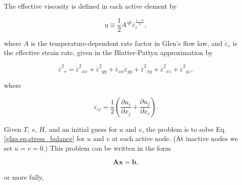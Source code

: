 The effective viscosity is defined in each active element by

\begin{equation}
  \label{gliss.eq.effective_viscosity}
  \eta \equiv \frac{1}{2} A^{\frac{-1}{n}} \dot{\varepsilon }_{e}^{\frac{1-n}{n}},
\end{equation}

\noindent
where $A$ is the temperature-dependent rate factor in Glen's flow law, and $\dot{\varepsilon }_{e}$ is the effective strain rate,
given in the Blatter-Pattyn approximation by 

\begin{equation}
  \label{gliss.eq.effective_strain_rate}
        {{\dot{\varepsilon }}^{2}}_{e}={{\dot{\varepsilon }}^{2}}_{xx}+{{\dot{\varepsilon }}^{2}}_{yy}+{{\dot{\varepsilon }}_{xx}}{{\dot{\varepsilon }}_{yy}}+{{\dot{\varepsilon }}^{2}}_{xy}+{{\dot{\varepsilon }}^{2}}_{xz}+{{\dot{\varepsilon }}^{2}}_{yz},
\end{equation}

\noindent
where

\begin{equation}
  \dot{\varepsilon }_{ij} = \frac{1}{2}\left( \frac{\partial u_{i}}{\partial x_{j}} + \frac{\partial u_{j}}{\partial x_{i}} \right).
\end{equation}

\noindent

Given $T$, $s$, $H$, and an initial guess for $u$ and $v$, the problem is to solve Eq. \eqref{gliss.eq.stress_balance}
for $u$ and $v$ at each active node.  (At inactive nodes we set $u=v=0$.)  This problem can be written in the form

\begin{equation}
  \label{gliss.eq.matrix_full}
  \mathbf{A} \mathbf{x} = \mathbf{b},
\end{equation}

\noindent
or more fully,

